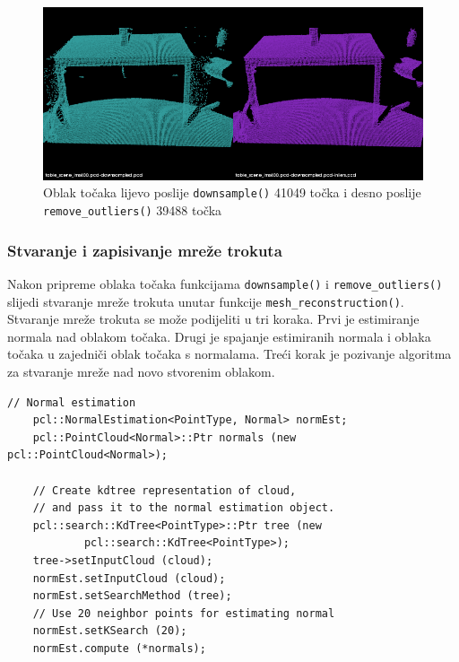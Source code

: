 \begin{figure}[h]
\centering
\includegraphics[scale=0.5]{figures/tablescene-remove-outliers-example.png}
\caption{Oblak točaka lijevo poslije \texttt{downsample()} 41049 točka i desno poslije
\texttt{remove\_outliers()} 39488 točka }
\label{fig:tablescene-outliers}
\end{figure}


\newpage
\subsubsection{Stvaranje i zapisivanje mreže trokuta} %
\label{ssub:Stvaranje i zapisivanje mreže trokuta}

Nakon pripreme oblaka točaka funkcijama \texttt{downsample()} i
\texttt{remove\_outliers()} slijedi stvaranje mreže trokuta unutar
funkcije \texttt{mesh\_reconstruction()}. Stvaranje mreže trokuta se
može podijeliti u tri koraka. Prvi je estimiranje normala nad oblakom
točaka. Drugi je spajanje estimiranih normala i oblaka točaka u
zajedniči oblak točaka s normalama. Treći korak je pozivanje algoritma
za stvaranje mreže nad novo stvorenim oblakom.

\begin{lstlisting}[label=lstStvaranje1, caption={Dio izvornog koda o
    estimaciji normala iz funkcije \texttt{reconstruct\_mesh()} }]
    // Normal estimation
    pcl::NormalEstimation<PointType, Normal> normEst;
    pcl::PointCloud<Normal>::Ptr normals (new pcl::PointCloud<Normal>);
    
    // Create kdtree representation of cloud, 
    // and pass it to the normal estimation object. 
    pcl::search::KdTree<PointType>::Ptr tree (new
            pcl::search::KdTree<PointType>);
    tree->setInputCloud (cloud);
    normEst.setInputCloud (cloud);
    normEst.setSearchMethod (tree);
    // Use 20 neighbor points for estimating normal
    normEst.setKSearch (20);
    normEst.compute (*normals);
\end{lstlisting}

